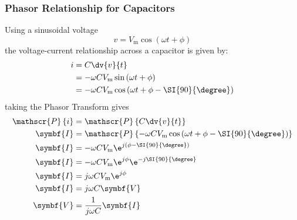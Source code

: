\documentclass{article}
\begin{document}
\subsubsection{Phasor Relationship for Capacitors}
Using a sinusoidal voltage
\begin{equation*}
    v = V_{\mathrm{m}}\cos{\left( \omega t + \phi \right)}
\end{equation*}
the voltage-current relationship across a capacitor is given by:
\begin{align*}
    i & = C \dv{v}{t}                                                                      \\
      & = -\omega C V_{\mathrm{m}} \sin{\left( \omega t + \phi \right)}                    \\
      & = -\omega C V_{\mathrm{m}} \cos{\left( \omega t + \phi - \SI{90}{\degree} \right)}
\end{align*}
taking the Phasor Transform gives
\begin{align*}
    \mathscr{P}\left\{ i \right\} & = \mathscr{P}\left\{ C \dv{v}{t} \right\}                                                                      \\
    \symbf{I}                     & = \mathscr{P}\left\{ -\omega C V_{\mathrm{m}} \cos{\left( \omega t + \phi - \SI{90}{\degree} \right)} \right\} \\
    \symbf{I}                     & = -\omega C V_{\mathrm{m}} \e^{j\left( \phi - \SI{90}{\degree} \right)}                                        \\
    \symbf{I}                     & = -\omega C V_{\mathrm{m}} \e^{j \phi} \e^{-j\SI{90}{\degree}}                                                 \\
    \symbf{I}                     & = j\omega C V_{\mathrm{m}} \e^{j \phi}                                                                         \\
    \symbf{I}                     & = j\omega C \symbf{V}                                                                                          \\
    \symbf{V}                     & = \frac{1}{j\omega C} \symbf{I}
\end{align*}
\end{document}
